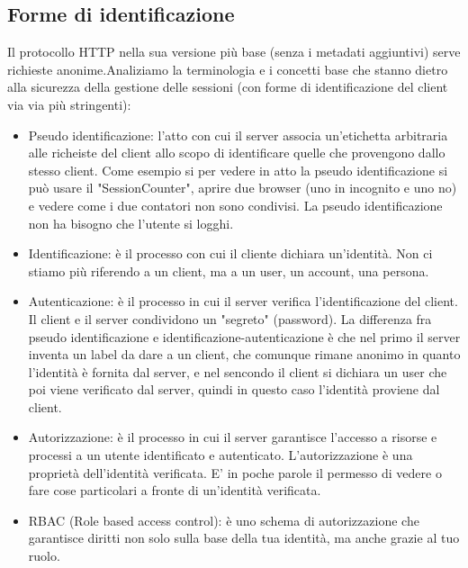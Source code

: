 \subsection{Forme di identificazione}
Il protocollo HTTP nella sua versione più base (senza i metadati aggiuntivi) serve richieste anonime. Analiziamo la terminologia e i concetti base che stanno dietro alla sicurezza della gestione delle sessioni (con forme di identificazione del client via via più stringenti):
\begin{itemize}
    \item Pseudo identificazione: l'atto con cui il server associa un'etichetta arbitraria alle richeiste del client allo scopo di identificare quelle che provengono dallo stesso client. Come esempio si per vedere in atto la pseudo identificazione si può usare il "SessionCounter", aprire due browser (uno in incognito e uno no) e vedere come i due contatori non sono condivisi. La pseudo identificazione non ha bisogno che l'utente si logghi.
    \item Identificazione: è il processo con cui il cliente dichiara un'identità. Non ci stiamo più riferendo a un client, ma a un user, un account, una persona.
    \item Autenticazione: è il processo in cui il server verifica l'identificazione del client. Il client e il server condividono un "segreto" (password). La differenza fra pseudo identificazione e identificazione-autenticazione è che nel primo il server inventa un label da dare a un client, che comunque rimane anonimo in quanto l'identità è fornita dal server, e nel sencondo il client si dichiara un user che poi viene verificato dal server, quindi in questo caso l'identità proviene dal client.
    \item Autorizzazione: è il processo in cui il server garantisce l'accesso a risorse e processi a un utente identificato e autenticato. L'autorizzazione è una proprietà dell'identità verificata. E' in poche parole il permesso di vedere o fare cose particolari a fronte di un'identità verificata.
    \item RBAC (Role based access control): è uno schema di autorizzazione che garantisce diritti non solo sulla base della tua identità, ma anche grazie al tuo ruolo.
\end{itemize}
